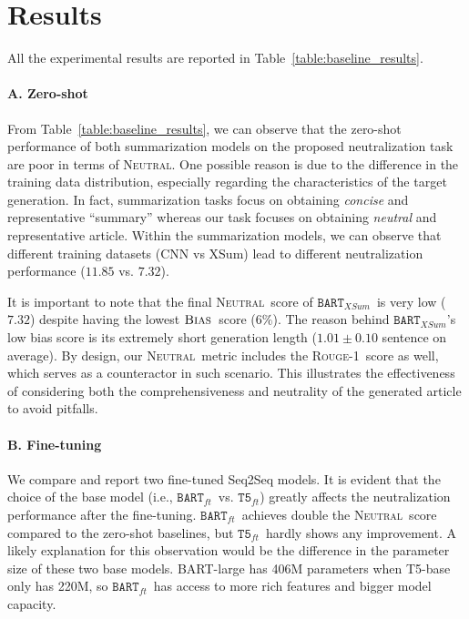 \documentclass[11pt,a4paper]{article}
\newcommand{\rouge}{{\scshape Rouge-1}}
\newcommand{\bartCNN}{$\texttt{BART}_{cnn}$}
\newcommand{\bartXSum}{$\texttt{BART}_{XSum}$}
\newcommand{\all}{$\textsc{Bias}$}
\newcommand{\neutral}{\textsc{Neutral}}
\newcommand{\finetune}{$\texttt{BART}_{ft}$}
\newcommand{\tfive}{$\texttt{T5}_{ft}$}
\begin{document}
\section{Results}
All the experimental results are reported in Table~\ref{table:baseline_results}.

\paragraph{A. Zero-shot} From Table~\ref{table:baseline_results}, we can observe that the zero-shot performance of both summarization models on the proposed neutralization task are poor in terms of \neutral. One possible reason is due to the difference in the training data distribution, especially regarding the characteristics of the target generation. In fact, summarization tasks focus on obtaining \textit{concise} and representative ``summary'' whereas our task focuses on obtaining \textit{neutral} and representative article. Within the summarization models, we can observe that different training datasets (CNN vs XSum) lead to different neutralization performance ($11.85$ vs. $7.32$). 

It is important to note that the final \neutral~score of \bartXSum~is very low ($7.32$) despite having the lowest \all~score ($6\%$). The reason behind \bartXSum's low bias score is its extremely short generation length ($1.01 \pm 0.10$ sentence on average). By design, our \neutral~metric includes the \rouge~score as well, which serves as a counteractor in such scenario. This illustrates the effectiveness of considering both the comprehensiveness and neutrality of the generated article to avoid pitfalls.

\paragraph{B. Fine-tuning} 
We compare and report two fine-tuned Seq2Seq models. It is evident that the choice of the base model (i.e., \finetune~vs. \tfive) greatly affects the neutralization performance after the fine-tuning. \finetune~achieves double the \neutral~score compared to the zero-shot baselines, but \tfive~hardly shows any improvement. A likely explanation for this observation would be the difference in the parameter size of these two base models. BART-large has 406M parameters when T5-base only has 220M, so \finetune~has access to more rich features and bigger model capacity. 
\end{document}
